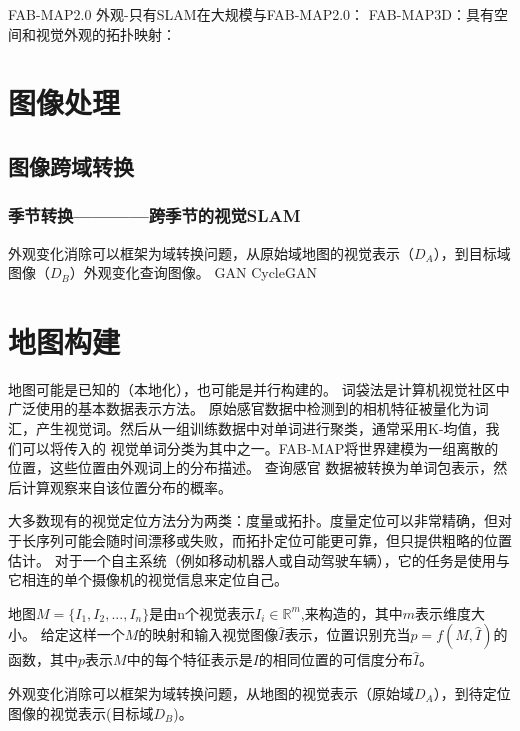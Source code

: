 FAB-MAP2.0\cite{Cummins2011Appearance}
外观-只有SLAM在大规模与FAB-MAP2.0：\cite{Cummins2011Appearance}
FAB-MAP3D：具有空间和视觉外观的拓扑映射：\cite{Paul2010FAB}

\section{图像处理}
\label{sec:preprocessing}
\subsection{图像跨域转换}
\subsubsection{季节转换————跨季节的视觉SLAM}
外观变化消除可以框架为域转换问题，从原始域地图的视觉表示（$D_A$），到目标域图像（$D_B$）外观变化查询图像。
GAN\cite{latif2017addressing}
CycleGAN\cite{zhu2017unpaired}

\section{地图构建}
\label{sec:map}
地图可能是已知的（本地化），也可能是并行构建的。 词袋法是计算机视觉社区中广泛使用的基本数据表示方法\cite{Sivic2003Video}。
原始感官数据中检测到的相机特征被量化为词汇，产生视觉词。然后从一组训练数据中对单词进行聚类，通常采用K-均值，我们可以将传入的
视觉单词分类为其中之一。FAB-MAP\cite{Cummins2008FAB}将世界建模为一组离散的位置，这些位置由外观词上的分布描述。 查询感官
数据被转换为单词包表示，然后计算观察来自该位置分布的概率。

大多数现有的视觉定位方法分为两类：度量或拓扑。度量定位可以非常精确，但对于长序列可能会随时间漂移或失败，而拓扑定位可能更可靠，但只提供粗略的位置估计。 对于一个自主系统（例如移动机器人或自动驾驶车辆），它的任务是使用与它相连的单个摄像机的视觉信息来定位自己。

地图$M = \{I_1, I_2, ..., I_n\}$是由n个视觉表示$I_i \in \mathbb{R}^m $,来构造的，其中$m$表示维度大小。 给定这样一个$M$的映射和输入视觉图像$\hat{I}$表示，位置识别充当$p = f(M, \hat{I})$的函数，其中$p$表示$M$中的每个特征表示是${I}$的相同位置的可信度分布$\hat{I}$。

外观变化消除可以框架为域转换问题，从地图的视觉表示（原始域$D_A$），到待定位图像的视觉表示(目标域$D_B$)。

